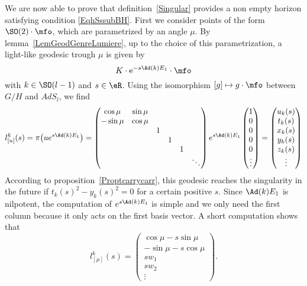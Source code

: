 We are now able to prove that definition~\ref{Singular} provides a non empty horizon satisfying condition \eqref{EqhSssubBH}.  First we  consider points of the form $\SO(2)\cdot\mfo$, which are parametrized by an angle $\mu$. By lemma~\ref{LemGeodGenreLumiere}, up to the choice of this parametrization, a light-like geodesic trough $\mu$ is given by
 \begin{equation}
   K\cdot \mbox{e}^{-s\Ad(k)E_1}\cdot\mfo
\end{equation}
with $k\in \SO(l-1)$ and  $s\in\eR$. Using the isomorphism $[g]\mapsto g\cdot \mfo$ between $G/H$ and $AdS_l$, we find
\begin{equation}		\label{EqhohnCondHOrExpl}
  l^k_{[u]}(s)= \pi\big( u e^{s\Ad(k)E_1} \big)=
\begin{pmatrix}
\cos\mu&\sin\mu\\
-\sin\mu&\cos\mu\\
&&1\\
&&&1\\
&&&&1\\
&&&&&\ddots
\end{pmatrix}
 e^{s\Ad(k)E_1}
\begin{pmatrix}
1\\0\\0\\0\\0\\\vdots
\end{pmatrix}
=
\begin{pmatrix}
u_{k}(s)\\t_{k}(s)\\x_{k}(s)\\y_{k}(s)\\z_{k}(s)\\\vdots
\end{pmatrix}
\end{equation}
According to proposition~\ref{Proptcarrycarr}, this geodesic reaches the singularity in the future if $t_{k}(s)^{2}-y_{k}(s)^{2}=0$ for a certain positive $s$. Since $\Ad(k)E_1$ is nilpotent, the computation of $ e^{s\Ad(k)E_1}$ is simple and we only need the first column because it only acts on the first basis vector. A short computation shows that
\begin{equation}  \label{EqGedCompo}
  l_{[\mu]}^{k}(s)=
\begin{pmatrix}
\cos\mu-s\sin\mu\\
-\sin\mu-s\cos\mu\\
sw_{1}\\
sw_{2}\\
\vdots
\end{pmatrix}.
\end{equation}

